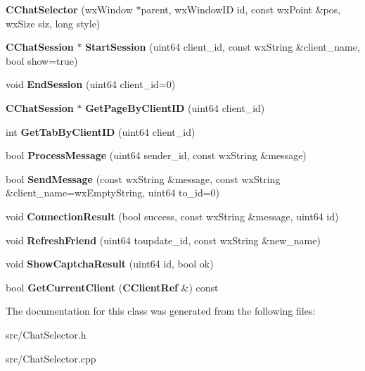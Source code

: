 \begin{DoxyCompactItemize}
\item 
{\bfseries CChatSelector} (wxWindow $\ast$parent, wxWindowID id, const wxPoint \&pos, wxSize siz, long style)\label{classCChatSelector_a90226d2db86f203cff5e95c7902b0def}

\item 
{\bf CChatSession} $\ast$ {\bfseries StartSession} (uint64 client\_\-id, const wxString \&client\_\-name, bool show=true)\label{classCChatSelector_a3e3bd6429dd458492a04ea6f62e9d65c}

\item 
void {\bfseries EndSession} (uint64 client\_\-id=0)\label{classCChatSelector_ac8a93e39d9fe3f4524cb98dac04aa150}

\item 
{\bf CChatSession} $\ast$ {\bfseries GetPageByClientID} (uint64 client\_\-id)\label{classCChatSelector_a555322d0114267cacd0f24cc3cd2ca21}

\item 
int {\bfseries GetTabByClientID} (uint64 client\_\-id)\label{classCChatSelector_a9d472aae485e3ef2555e0fbbb639e221}

\item 
bool {\bfseries ProcessMessage} (uint64 sender\_\-id, const wxString \&message)\label{classCChatSelector_adf9c5c2f2b72f7699c552aaf0f504bf3}

\item 
bool {\bfseries SendMessage} (const wxString \&message, const wxString \&client\_\-name=wxEmptyString, uint64 to\_\-id=0)\label{classCChatSelector_aad15eba1222d151218c2b73778ea1e62}

\item 
void {\bfseries ConnectionResult} (bool success, const wxString \&message, uint64 id)\label{classCChatSelector_a95252109f8b8988b2ecadef7970d1e7b}

\item 
void {\bfseries RefreshFriend} (uint64 toupdate\_\-id, const wxString \&new\_\-name)\label{classCChatSelector_a9dce271d3df1b991a6fd5c9e06146ca3}

\item 
void {\bfseries ShowCaptchaResult} (uint64 id, bool ok)\label{classCChatSelector_a2affdf7550fda934e96c17f9b5f78467}

\item 
bool {\bfseries GetCurrentClient} ({\bf CClientRef} \&) const \label{classCChatSelector_aec38d2f00be944abc1f8f1aa513454ce}

\end{DoxyCompactItemize}


The documentation for this class was generated from the following files:\begin{DoxyCompactItemize}
\item 
src/ChatSelector.h\item 
src/ChatSelector.cpp\end{DoxyCompactItemize}
